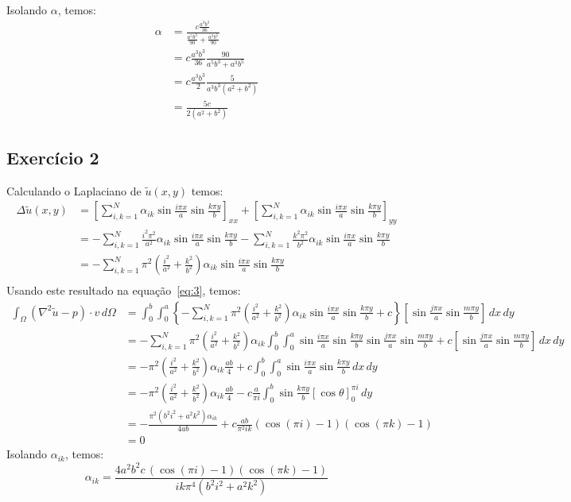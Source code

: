 \documentclass[10pt,a4paper]{article}
\begin{document}
	Isolando $\alpha$, temos:
	\begin{align*}
		\alpha  &= \frac{c\frac{a^3b^3}{36}}{\frac{a^5b^3}{90} + \frac{a^3b^5}{90}}\\
		&= c\frac{a^3b^3}{36}\frac{90}{a^5b^3+a^3b^5}\\
		&= c\frac{a^3b^3}{2}\frac{5}{a^3b^3(a^2+b^2)}\\
		&= \frac{5c}{2(a^2+b^2)}
	\end{align*}
	
	\subsection{Exercício 2}
	Calculando o Laplaciano de $\tilde{u}(x,y)$ temos:
	\begin{align*}
		\Delta \tilde{u}(x,y) &= \left[\sum_{i,k=1}^N\alpha_{ik}\sin{\frac{i\pi x}{a}}\sin{\frac{k\pi y}{b}}\right]_{xx} + \left[\sum_{i,k=1}^N\alpha_{ik}\sin{\frac{i\pi x}{a}}\sin{\frac{k\pi y}{b}}\right]_{yy}\\
		&= -\sum_{i,k=1}^N\frac{i^2\pi^2}{a^2}\alpha_{ik}\sin{\frac{i\pi x}{a}}\sin{\frac{k\pi y}{b}} -\sum_{i,k=1}^N\frac{k^2\pi^2}{b^2}\alpha_{ik}\sin{\frac{i\pi x}{a}}\sin{\frac{k\pi y}{b}}\\
		&= -\sum_{i,k=1}^N\pi^2\left(\frac{i^2}{a^2}+\frac{k^2}{b^2}\right)\alpha_{ik}\sin{\frac{i\pi x}{a}}\sin{\frac{k\pi y}{b}}\\
	\end{align*}
	Usando este resultado na equação~\ref{eq:3}, temos:
	\begin{align*}
		\int_\Omega \left(\nabla^2\tilde{u}-p\right)\cdot v\,d\Omega &= \int_0^b \int_0^a \left\{-\sum_{i,k=1}^N\pi^2\left(\frac{i^2}{a^2}+\frac{k^2}{b^2}\right)\alpha_{ik}\sin{\frac{i\pi x}{a}}\sin{\frac{k\pi y}{b}} + c\right\} \left[ \sin{\frac{j\pi x}{a}}\sin{\frac{m\pi y}{b}} \right] \,dx\,dy\\
&=-\sum_{i,k=1}^N\pi^2\left(\frac{i^2}{a^2}+\frac{k^2}{b^2}\right)\alpha_{ik}\int_0^b \int_0^a \sin{\frac{i\pi x}{a}}\sin{\frac{k\pi y}{b}}\sin{\frac{j\pi x}{a}}\sin{\frac{m\pi y}{b}} + c \left[ \sin{\frac{j\pi x}{a}}\sin{\frac{m\pi y}{b}} \right] \,dx\,dy\\
&= -\pi^2\left(\frac{i^2}{a^2}+\frac{k^2}{b^2}\right)\alpha_{ik} \frac{ab}{4} + c \int_0^b \int_0^a \sin{\frac{i\pi x}{a}}\sin{\frac{k\pi y}{b}} \,dx\,dy\\
&= -\pi^2\left(\frac{i^2}{a^2}+\frac{k^2}{b^2}\right)\alpha_{ik}\frac{ab}{4} - c \frac{a}{\pi i} \int_0^b\sin{\frac{k\pi y}{b}}\left[\cos{\theta}\right]_0^{\pi i}\,dy\\
&= -\frac{\pi^2(b^2i^2+a^2k^2)\alpha_{ik}}{4ab} + c \frac{ab}{\pi^2 ik} (\cos{(\pi i)}-1)(\cos{(\pi k)}-1)\\
&= 0
	\end{align*}
	Isolando $\alpha_{ik}$, temos:
	\[\alpha_{ik}  = \frac{4a^2b^2c\,(\cos{(\pi i)}-1)(\cos{(\pi k)}-1)}{ik\pi^4(b^2i^2+a^2k^2)}\]
	
\end{document}
